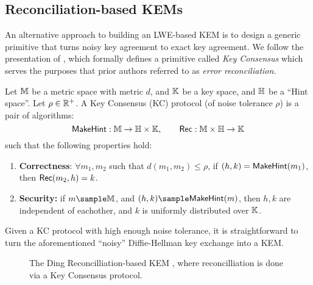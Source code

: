 \subsection{Reconciliation-based KEMs}
An alternative approach to building an LWE-based KEM is to design a generic primitive that turns noisy key agreement to exact key agreement.
We follow the presentation of \cite{EPRINT:JinZha17}, which formally defines a primitive called \emph{Key Consensus} which serves the purposes that prior authors \cite{EPRINT:Ding12,PQCRYPTO:Peikert14} referred to as \emph{error reconciliation}.
\begin{definition}
	Let $\mathbb{M}$ be a metric space with metric $d$, and $\mathbb{K}$ be a key space, and $\mathbb{H}$ be a ``Hint space''.
	Let $\rho\in\mathbb{R}^+$.
	A Key Consensus (KC) protocol (of noise tolerance $\rho$) is a pair of algorithms:
	\begin{equation*}
	\mathsf{MakeHint} : \mathbb{M}\to \mathbb{H}\times \mathbb{K},\qquad \mathsf{Rec} : \mathbb{M}\times \mathbb{H}\to \mathbb{K}
	\end{equation*}
	such that the following properties hold:
\begin{enumerate}
	\item \textbf{Correctness}: $\forall m_1, m_2$ such that $d(m_1, m_2) \leq \rho$, if $(h, k) = \mathsf{MakeHint}(m_1)$, then $\mathsf{Rec}(m_2, h) = k$.
	\item \textbf{Security:} if $m\sample \setfont{M}$, and $(h, k) \sample\makehint(m)$, then $h, k$ are independent of eachother, and $k$ is uniformly distributed over $\mathbb{K}$.
\end{enumerate}	
\end{definition}
Given a KC protocol with high enough noise tolerance, it is straightforward to turn the aforementioned ``noisy'' Diffie-Hellman key exchange into a KEM.

\begin{figure}\label{fig: ding-KEM}
	\begin{minipage}{.3\linewidth}
	\end{minipage}\hfill
	\begin{minipage}{.3\linewidth}
	\end{minipage}\hfill
	\begin{minipage}{.3\linewidth}
	\end{minipage}
\caption{The Ding Reconcilliation-based KEM \cite{EPRINT:Ding12}, where reconcilliation is done via a Key Consensus protocol.}
\end{figure}


